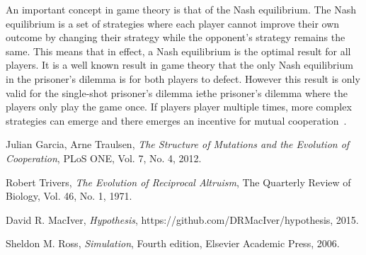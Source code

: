 \documentclass[a4paper,11pt]{article}
\begin{document}
An important concept in game theory is that of the Nash equilibrium.
The Nash equilibrium is a set of strategies where each player cannot improve their own outcome by changing their strategy while the opponent's strategy remains the same.
This means that in effect, a Nash equilibrium is the optimal result for all players.
It is a well known result in game theory that the only Nash equilibrium in the prisoner's dilemma is for both players to defect.
However this result is only valid for the single-shot prisoner's dilemma ie\. the prisoner's dilemma where the players only play the game once.
If players player multiple times, more complex strategies can emerge and there emerges an incentive for mutual cooperation~\cite{trivers}.

\begin{thebibliography}{9}

        Julian Garcia, Arne Traulsen,
        \emph{The Structure of Mutations and the Evolution of Cooperation},
        PLoS ONE,
        Vol. 7,
        No. 4,
        2012.

        Robert Trivers,
        \emph{The Evolution of Reciprocal Altruism},
        The Quarterly Review of Biology,
        Vol. 46,
        No. 1,
        1971.

        David R. MacIver,
        \emph{Hypothesis},
        https://github.com/DRMacIver/hypothesis,
        2015.

        Sheldon M. Ross,
        \emph{Simulation},
        Fourth edition,
        Elsevier Academic Press,
        2006.

\end{thebibliography}
\end{document}
